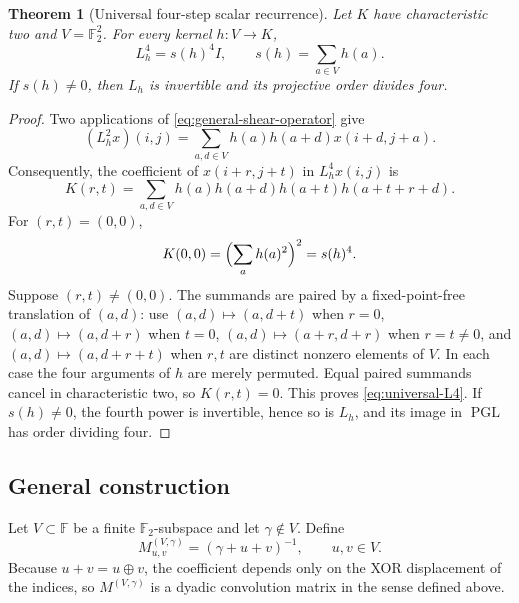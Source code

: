 \documentclass[10pt,reqno]{amsart}
\theoremstyle{plain}
\newtheorem{theorem}{Theorem}[section]
\theoremstyle{remark}\newtheorem{remark}[theorem]{Remark}
\theoremstyle{definition}\newtheorem{definition}[theorem]{Definition}
\newcommand{\F}{\mathbb F}
\newcommand{\PGL}{\operatorname{PGL}}
\begin{document}
\begin{theorem}[Universal four-step scalar recurrence]\label{thm:universal-recurrence}
Let \(K\) have characteristic two and \(V=\F_2^2\).  For every kernel \(h:V\to K\),
\begin{equation}
L_h^4=s(h)^4I,\qquad s(h)=\sum_{a\in V}h(a).
\label{eq:universal-L4}
\end{equation}
If \(s(h)\ne0\), then \(L_h\) is invertible and its projective order divides four.
\end{theorem}
\begin{proof}
Two applications of \eqref{eq:general-shear-operator} give
\[
(L_h^2x)(i,j)=\sum_{a,d\in V}h(a)h(a+d)x(i+d,j+a).
\]
Consequently, the coefficient of \(x(i+r,j+t)\) in \(L_h^4x(i,j)\) is
\[
K(r,t)=\sum_{a,d\in V}h(a)h(a+d)h(a+t)h(a+t+r+d).
\]
For \((r,t)=(0,0)\),
\[
K(0,0)=\Bigl(\sum_a h(a)^2\Bigr)^2=s(h)^4.
\]
Suppose \((r,t)\ne(0,0)\).  The summands are paired by a fixed-point-free translation of \((a,d)\): use \((a,d)\mapsto(a,d+t)\) when \(r=0\), \((a,d)\mapsto(a,d+r)\) when \(t=0\), \((a,d)\mapsto(a+r,d+r)\) when \(r=t\ne0\), and \((a,d)\mapsto(a,d+r+t)\) when \(r,t\) are distinct nonzero elements of \(V\).  In each case the four arguments of \(h\) are merely permuted.  Equal paired summands cancel in characteristic two, so \(K(r,t)=0\).  This proves \eqref{eq:universal-L4}.  If \(s(h)\ne0\), the fourth power is invertible, hence so is \(L_h\), and its image in \(\PGL\) has order dividing four.
\end{proof}

\subsection{General construction}
Let $V\subset\F$ be a finite $\F_2$-subspace and let $\gamma\notin V$. Define
\begin{equation}
M^{(V,\gamma)}_{u,v}=(\gamma+u+v)^{-1},\qquad u,v\in V.
\label{eq:generalM}
\end{equation}
Because $u+v=u\oplus v$, the coefficient depends only on the XOR displacement of the indices, so $M^{(V,\gamma)}$ is a dyadic convolution matrix in the sense defined above.
\end{document}
